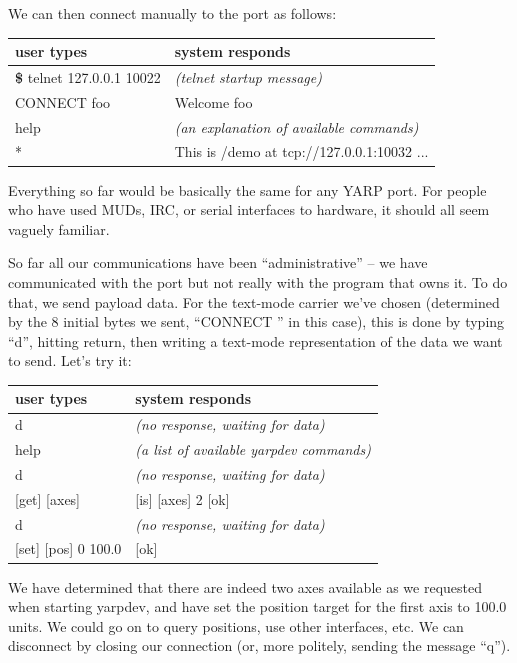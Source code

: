 We can then connect manually to the port as follows:

\begin{center}
\begin{tabular}{ll}
\hline\hline
{\bf user types} & {\bf system responds} \\
\hline
{\bf \$} telnet 127.0.0.1 10022 & {\it (telnet startup message)} \\
CONNECT foo & Welcome foo \\
help & {\it (an explanation of available commands)} \\
* & This is /demo at tcp://127.0.0.1:10032 ... \\
\hline\hline
\end{tabular}
\end{center}

Everything so far would be basically the same for any YARP port.
For people who have used MUDs, IRC, or serial interfaces to hardware,
it should all seem vaguely familiar.

So far all our communications have been ``administrative'' --
we have communicated with the port but not really with the 
program that owns it.  To do that, we send payload data.  For the
text-mode carrier we've chosen (determined by the 8 initial
bytes we sent, ``CONNECT '' in this case), this is done by typing
``d'', hitting return, then writing a text-mode representation of
the data we want to send.  Let's try it:

\begin{center}
\begin{tabular}{ll}
\hline\hline
{\bf user types} & {\bf system responds} \\
\hline
 d & {\it (no response, waiting for data)} \\
 help & {\it (a list of available yarpdev commands)} \\
 d & {\it (no response, waiting for data)} \\
 {[get] [axes]} &  {[is] [axes] 2 [ok]} \\
 d & {\it (no response, waiting for data)} \\
 {[set] [pos] 0 100.0} & {[ok]} \\
\hline\hline
\end{tabular}
\end{center}

We have determined that there are indeed two axes available as we requested
when starting yarpdev, and have set the position target for the
first axis to 100.0 units.  We could go on to query positions, use
other interfaces, etc.  We can disconnect by closing our connection
(or, more politely, sending the message ``q'').

